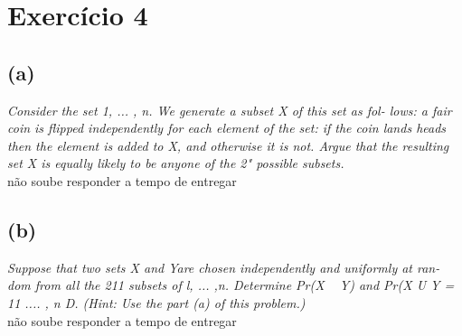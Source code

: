 \documentclass{article}
\begin{document}
\section{Exercício 4}
\subsection*{(a)}
\textit{Consider the set {1, ... , n}. We generate a subset X of this set as fol-
lows: a fair coin is flipped independently for each element of the set: if the coin lands
heads then the element is added to X, and otherwise it is not. Argue that the resulting
set X is equally likely to be anyone of the 2" possible subsets.}\\

\< não soube responder a tempo de entregar \>

\subsection*{(b)}
\textit{Suppose that two sets X and Yare chosen independently and uniformly at ran-
dom from all the 211 subsets of {l, ... ,n}. Determine Pr(X ~ Y) and Pr(X U Y =
11 .... , n D. (Hint: Use the part (a) of this problem.)}\\

\< não soube responder a tempo de entregar \>
\end{document}

